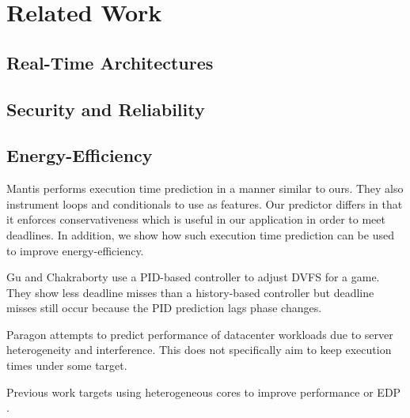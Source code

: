 \chapter{Related Work}
\label{chap:related_work}

\section{Real-Time Architectures}
\label{sec:related_work.realtime}

\section{Security and Reliability}
\label{sec:related_work.security}

\section{Energy-Efficiency}
\label{sec:related_work.energy}

Mantis \cite{mantis-atc13} performs execution time prediction in a manner
similar to ours. They also instrument loops and conditionals to use as
features. Our predictor differs in that it enforces conservativeness which is
useful in our application in order to meet deadlines. In addition, we show how
such execution time prediction can be used to improve energy-efficiency.

Gu and Chakraborty \cite{gu-dac08} use a PID-based controller to adjust DVFS
for a game. They show less deadline misses than a history-based controller but
deadline misses still occur because the PID prediction lags phase changes.

Paragon \cite{paragon-asplos13} attempts to predict performance of datacenter
workloads due to server heterogeneity and interference. This does not
specifically aim to keep execution times under some target.

Previous work targets using heterogeneous cores to improve performance
\cite{paragon-asplos13, pie-isca12, heteroscouts-sigmetrics11} or EDP \cite{chen-dac09}.

